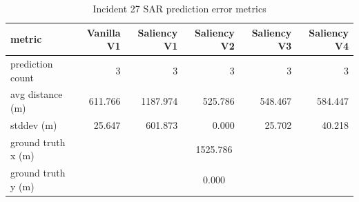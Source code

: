 \begin{table}[ht]
\centering
\caption{Incident 27 SAR prediction error metrics}
\label{tab:sar-incident-27}
\begin{tabular}{lrrrrr}
\hline
metric & Vanilla V1 & Saliency V1 & Saliency V2 & Saliency V3 & Saliency V4 \\
\hline
prediction count & 3 & 3 & 3 & 3 & 3 \\
avg distance (m) & 611.766 & 1187.974 & 525.786 & 548.467 & 584.447 \\
stddev (m) & 25.647 & 601.873 & 0.000 & 25.702 & 40.218 \\
ground truth x (m) & \multicolumn{5}{c}{1525.786} \\
ground truth y (m) & \multicolumn{5}{c}{0.000} \\
\hline
\end{tabular}
\end{table}
